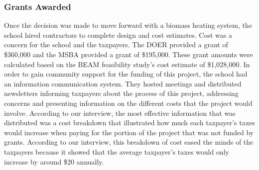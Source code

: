 \subsubsection{Grants Awarded}
\par Once the decision was made to move forward with a biomass heating system, the school hired contractors to complete design and cost estimates. Cost was a concern for the school and the taxpayers. The DOER provided a grant of \$360,000 and the MSBA provided a grant of \$195,000. These grant amounts were calculated based on the BEAM feasibility study's cost estimate of \$1,028,000. In order to gain community support for the funding of this project, the school had an information communication system. They hosted meetings and distributed newsletters informing taxpayers about the process of this project, addressing concerns and presenting information on the different costs that the project would involve. According to our interview, the most effective information that was distributed was a cost breakdown that illustrated how much each taxpayer's taxes would increase when paying for the portion of the project that was not funded by grants. According to our interview, this breakdown of cost eased the minds of the taxpayers because it showed that the average taxpayer's taxes would only increase by around \$20 annually.


